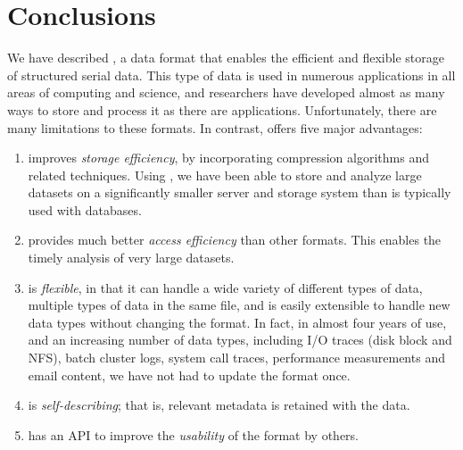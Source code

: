 \section{Conclusions}\label{sec:conclusions}

We have described \DataSeries{}, a data format that enables the efficient
and flexible storage of structured serial data. This type of data is
used in numerous applications in all areas of computing
and science, and researchers have developed almost as many ways to
store and process it as there are applications. Unfortunately, there are
many limitations to these formats. In contrast, \DataSeries{} offers five major
advantages:
\begin{enumerate}
\item \DataSeries{} improves \textit{storage efficiency}, by
 incorporating compression algorithms and related techniques.  Using
 \DataSeries{}, we have been able to store and analyze large datasets on
 a significantly smaller server and storage system than is typically
 used with databases.

\item \DataSeries{} provides much better \textit{access efficiency} than
other formats.  This enables the timely analysis of very large datasets.

\item \DataSeries{} is \textit{flexible}, in that it can handle a wide variety of
different types of data, multiple types of data in the same file, and
is easily extensible to handle new data types without changing the
format. In fact, in almost four years of use, and an increasing number of
data types, including I/O traces (disk block and NFS), batch cluster logs, 
system call traces, performance measurements and email content, we have 
not had to update the format once.

\item \DataSeries{} is \textit{self-describing}; that is, relevant metadata is retained with the data.

\item \DataSeries{} has an API to improve the \textit{usability} of the format by others.
\end{enumerate}

